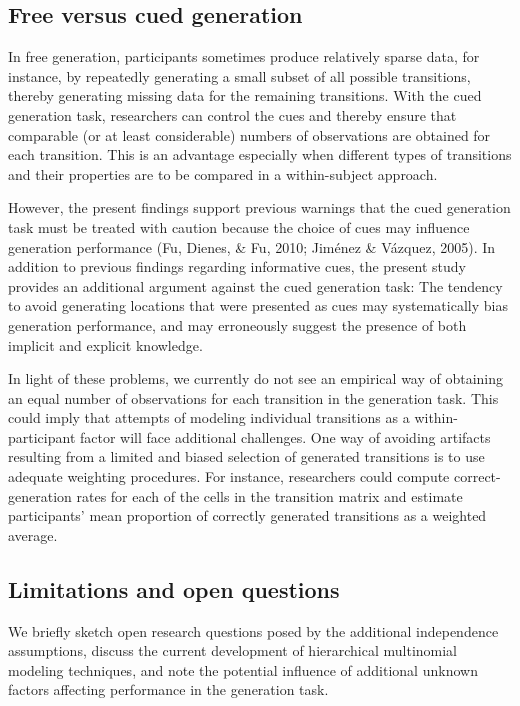\documentclass[
  english,
  man]{apa6}
\begin{document}
\hypertarget{free-versus-cued-generation}{%
\subsection{Free versus cued generation}\label{free-versus-cued-generation}}

In free generation, participants sometimes produce relatively sparse data, for instance, by repeatedly generating a small subset of all possible transitions, thereby generating missing data for the remaining transitions.
With the cued generation task, researchers can control the cues and thereby ensure that comparable (or at least considerable) numbers of observations are obtained for each transition.
This is an advantage especially when different types of transitions and their properties are to be compared in a within-subject approach.

However, the present findings support previous warnings that the cued generation task must be treated with caution because the choice of cues may influence generation performance (Fu, Dienes, \& Fu, 2010; Jiménez \& Vázquez, 2005).
In addition to previous findings regarding informative cues, the present study provides an additional argument against the cued generation task:
The tendency to avoid generating locations that were presented as cues may systematically bias generation performance, and may erroneously suggest the presence of both implicit and explicit knowledge.

In light of these problems, we currently do not see an empirical way of obtaining an equal number of observations for each transition in the generation task.
This could imply that attempts of modeling individual transitions as a within-participant factor will face additional challenges.
One way of avoiding artifacts resulting from a limited and biased selection of generated transitions is to use adequate weighting procedures.
For instance, researchers could compute correct-generation rates for each of the cells in the transition matrix and estimate participants' mean proportion of correctly generated transitions as a weighted average.

\hypertarget{limitations-and-open-questions}{%
\subsection{Limitations and open questions}\label{limitations-and-open-questions}}

We briefly sketch open research questions posed by the additional independence assumptions, discuss the current development of hierarchical multinomial modeling techniques, and note the potential influence of additional unknown factors affecting performance in the generation task.
\end{document}
